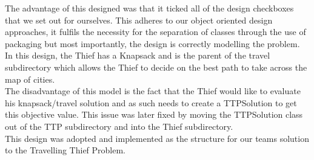 \documentclass[a4paper,12pt]{article}
\begin{document}
The advantage of this designed was that it ticked all of the design checkboxes that we set out for ourselves. This adheres to our object oriented design approaches, it fulfils the necessity for the separation of classes through the use of packaging but most importantly, the design is correctly modelling the problem. In this design, the Thief has a Knapsack and is the parent of the travel subdirectory which allows the Thief to decide on the best path to take across the map of cities.
\\
The disadvantage of this model is the fact that the Thief would like to evaluate his knapsack/travel solution and as such needs to create a TTPSolution to get this objective value. This issue was later fixed by moving the TTPSolution class out of the TTP subdirectory and into the Thief subdirectory.
\\
This design was adopted and implemented as the structure for our teams solution to the Travelling Thief Problem.
\end{document}
